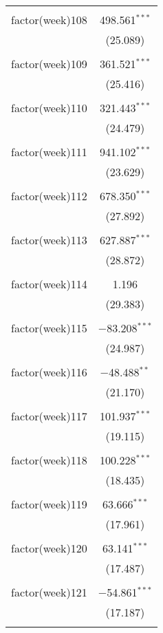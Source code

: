 \documentclass{article}
\begin{document}
\begin{table}[!htbp]
\begin{tabular}{@{\extracolsep{5pt}}lc}
  & \\ 
 factor(week)108 & 498.561$^{***}$ \\ 
  & (25.089) \\ 
  & \\ 
 factor(week)109 & 361.521$^{***}$ \\ 
  & (25.416) \\ 
  & \\ 
 factor(week)110 & 321.443$^{***}$ \\ 
  & (24.479) \\ 
  & \\ 
 factor(week)111 & 941.102$^{***}$ \\ 
  & (23.629) \\ 
  & \\ 
 factor(week)112 & 678.350$^{***}$ \\ 
  & (27.892) \\ 
  & \\ 
 factor(week)113 & 627.887$^{***}$ \\ 
  & (28.872) \\ 
  & \\ 
 factor(week)114 & 1.196 \\ 
  & (29.383) \\ 
  & \\ 
 factor(week)115 & $-$83.208$^{***}$ \\ 
  & (24.987) \\ 
  & \\ 
 factor(week)116 & $-$48.488$^{**}$ \\ 
  & (21.170) \\ 
  & \\ 
 factor(week)117 & 101.937$^{***}$ \\ 
  & (19.115) \\ 
  & \\ 
 factor(week)118 & 100.228$^{***}$ \\ 
  & (18.435) \\ 
  & \\ 
 factor(week)119 & 63.666$^{***}$ \\ 
  & (17.961) \\ 
  & \\ 
 factor(week)120 & 63.141$^{***}$ \\ 
  & (17.487) \\ 
  & \\ 
 factor(week)121 & $-$54.861$^{***}$ \\ 
  & (17.187) \\ 
  & \\ 

\end{tabular}
\end{table}
\end{document}

